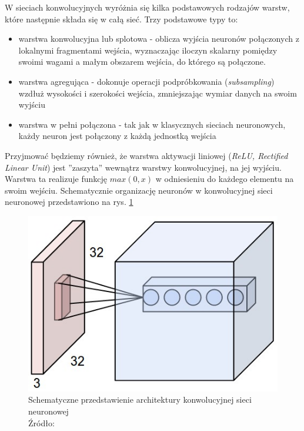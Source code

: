 W sieciach konwolucyjnych wyróżnia się kilka podstawowych rodzajów warstw, które następnie składa się w całą sieć.
Trzy podstawowe typy to:
\begin{itemize}
	\item warstwa konwolucyjna lub splotowa - oblicza wyjścia neuronów połączonych z lokalnymi fragmentami wejścia, wyznaczając iloczyn skalarny pomiędzy swoimi wagami a małym obszarem wejścia, do którego są połączone.
	\item warstwa agregująca - dokonuje operacji podpróbkowania (\textit{subsampling}) wzdłuż wysokości i szerokości wejścia, zmniejszając wymiar danych na swoim wyjściu
	\item warstwa w pełni połączona - tak jak w klasycznych sieciach neuronowych, każdy neuron jest połączony z każdą jednostką wejścia
\end{itemize}

Przyjmować będziemy również, że warstwa aktywacji liniowej (\textit{ReLU, Rectified Linear Unit}) jest ''zaszyta'' wewnątrz warstwy konwolucyjnej, na jej wyjściu.
Warstwa ta realizuje funkcję $max(0, x)$ w odniesieniu do każdego elementu na swoim wejściu. \cite{cs231n}
Schematycznie organizację neuronów w konwolucyjnej sieci neuronowej przedstawiono na rys. \ref{fig:cnn}

\begin{figure}[h!tb]
	 \centering
	 \includegraphics[width = 1.0\linewidth]{img/cnn}
	 \caption{Schematyczne przedstawienie architektury konwolucyjnej sieci neuronowej \\
              Źródło: \cite{cs231n}}
	 \label{fig:cnn}
\end{figure}

